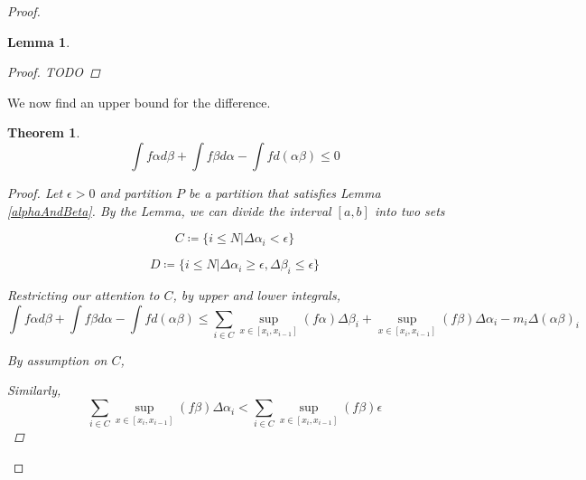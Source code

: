 \documentclass{amsart}
\newtheorem{theorem}{Theorem}[subsection]
\newtheorem{lemma}{Lemma}[subsubsection]
\begin{document}
\begin{proof}
\begin{lemma}
\begin{proof}
TODO
\end{proof}
\end{lemma}

We now find an upper bound for the difference.

\begin{theorem}
\[
\int f\alpha d\beta + \int f\beta d\alpha - \int f d(\alpha\beta) \leq 0
\]

\begin{proof}
Let $\epsilon > 0$ and partition $P$ be a partition that satisfies Lemma \ref{alphaAndBeta}. By the Lemma, we can divide the interval $[a, b]$ into two sets

\[C \coloneqq \{i \leq N | \Delta\alpha_i < \epsilon \} \]

\[D \coloneqq \{i \leq N | \Delta\alpha_i \geq \epsilon, \Delta\beta_i \leq \epsilon \} \]

Restricting our attention to $C$, by upper and lower integrals,
\[
\int f\alpha d\beta + \int f\beta d\alpha - \int f d(\alpha\beta) 
\leq \sum_{i \in C} \sup_{x \in[x_i, x_{i-1}]} (f\alpha) \Delta\beta_i
+ \sup_{x \in[x_i, x_{i-1}]} (f\beta) \Delta\alpha_i
- m_i \Delta(\alpha\beta)_i
\]

By assumption on $C$,

Similarly, 
\[
\sum_{i \in C} \sup_{x \in[x_i, x_{i-1}]} (f\beta) \Delta\alpha_i < \sum_{i \in C} \sup_{x \in[x_i, x_{i-1}]} (f\beta) \epsilon
\]

\end{proof}
\end{theorem}

\end{proof}
\end{document}
